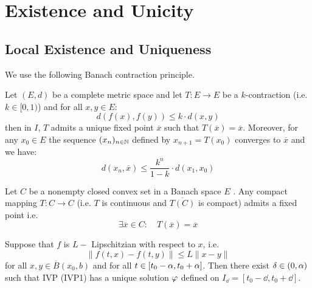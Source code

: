 \section{Existence and Unicity}
\subsection{Local Existence and Uniqueness}
We use the following Banach contraction principle.
\begin{theorem}[]
Let $(E, d)  $  be a complete metric space and let $ T : E \longrightarrow E $ be a 
$k $-contraction (i.e. $k \in [0, 1) $) and for all 
$x,y \in  E $: 
\[
d(f(x) , f(y) )  \leq  k \cdot  d(x, y) 
\]
then in $I $, $T$ admits a unique fixed point $\overline{x}$ such that $T(\overline{x}) = \overline{x}  $. Moreover,
for any $x_0 \in  E $ the sequence 
$(x_n )_{n \in  \mathbb{N}}  $ defined by $x_{n+1} = T(x_0)  $ converges to $\overline{x} $ and we have: 
\[
d(x_n , \overline{x})  \leq 
\frac{k^{n}}{1-k} \cdot d(x_1, x_0) 
\]
\end{theorem}
\begin{theorem}[Schauder]
Let $C $ be a nonempty closed convex set in a Banach space $E $ . 
Any compact mapping $ T : C \longrightarrow C $
(i.e. $T $ is continuous and $\overline{T(C) } $ is compact) admits a fixed point 
i.e. 
\[
\exists \overline{x}\in   C: \quad T(\overline{x})  = \overline{x}
\]
\end{theorem}
\begin{theorem}[]
Suppose that $f $ is $L- $ Lipschitzian with respect to $x $, i.e. 
\[
  \| f(t,x) - f(t, y)  \| \leq  L \| x-y \| 
\]
for all $x, y \in  \overline{B}(x_0, b) $ and for all $t \in  \left[ t_0 - \alpha, t_0 + \alpha \right] $. Then 
there exist $\delta  \in   (0, \alpha)  $ such that IVP (IVP1) has a unique solution $\varphi  $ defined on 
$I_{\dd } = \left[ t_0 - \dd , t_0 + \dd  \right]$.
\end{theorem}

